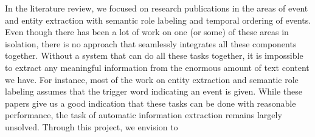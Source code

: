 In the literature review, we focused on research publications in the areas of event and entity extraction with semantic role labeling and temporal ordering of events. Even though there has been a lot of work on one (or some) of these areas in isolation, there is no approach that seamlessly integrates all these components together. Without a system that can do all these tasks together, it is impossible to extract any meaningful information from the enormous amount of text content we have. For instance, most of the work on entity extraction and semantic role labeling assumes that the trigger word indicating an event is given. While these papers give us a good indication that these tasks can be done with reasonable performance, the task of automatic information extraction remains largely unsolved. Through this project, we envision to 